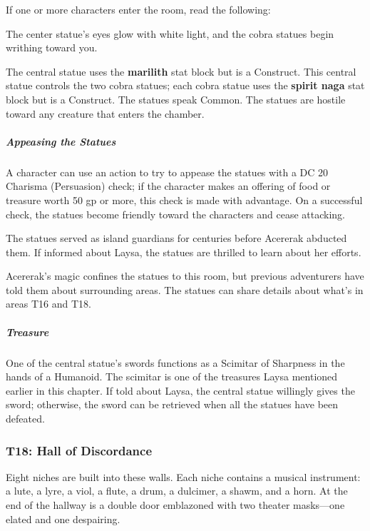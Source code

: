\documentclass[10pt,a4paper,twoside,bg=print,twocolumn,openany,nodeprecatedcode]{dndbook}
\begin{document}
If one or more characters enter the room, read the following:

\begin{DndReadAloud}{}
The center statue's eyes glow with white light, and the cobra statues begin writhing toward you.

\end{DndReadAloud}

The central statue uses the \textbf{marilith} stat block but is a Construct. This central statue controls the two cobra statues; each cobra statue uses the \textbf{spirit naga} stat block but is a Construct. The statues speak Common. The statues are hostile toward any creature that enters the chamber.

\subparagraph{Appeasing the Statues}
A character can use an action to try to appease the statues with a DC 20 Charisma (Persuasion) check; if the character makes an offering of food or treasure worth 50 gp or more, this check is made with advantage. On a successful check, the statues become friendly toward the characters and cease attacking.

The statues served as island guardians for centuries before Acererak abducted them. If informed about Laysa, the statues are thrilled to learn about her efforts.

Acererak's magic confines the statues to this room, but previous adventurers have told them about surrounding areas. The statues can share details about what's in areas T16 and T18.

\subparagraph{Treasure}
One of the central statue's swords functions as a Scimitar of Sharpness in the hands of a Humanoid. The scimitar is one of the treasures Laysa mentioned earlier in this chapter. If told about Laysa, the central statue willingly gives the sword; otherwise, the sword can be retrieved when all the statues have been defeated.

\subsubsection{T18: Hall of Discordance}
\begin{DndReadAloud}{}
Eight niches are built into these walls. Each niche contains a musical instrument: a lute, a lyre, a viol, a flute, a drum, a dulcimer, a shawm, and a horn. At the end of the hallway is a double door emblazoned with two theater masks—one elated and one despairing.

\end{DndReadAloud}
\end{document}
